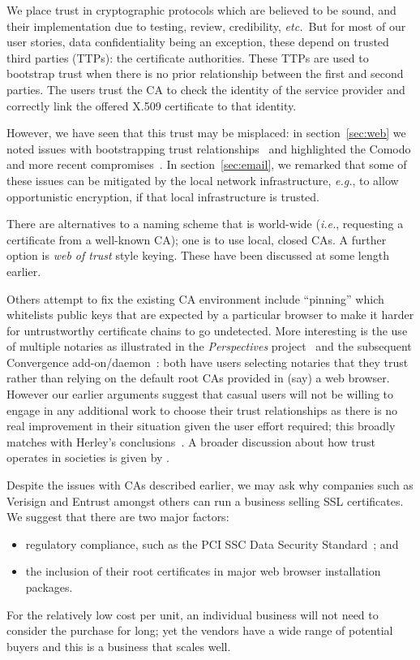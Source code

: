 \documentclass{article}
\def\citeN{\citet}
\def\cite{\citep}
\newcommand{\eg}{\textit{e.g.}}
\newcommand{\etc}{\textit{etc.}}
\newcommand{\ie}{\textit{i.e.}}
\begin{document}
We place trust in cryptographic protocols which are believed to be
sound, and their implementation due to testing, review, credibility,
\etc\  But for most of our user stories, data confidentiality being
an exception, these depend on trusted third parties (TTPs): the certificate authorities.  These
TTPs are used to bootstrap trust when there is no prior relationship
between the first and second parties.
The users trust the CA to check the identity of the service provider and correctly link the offered X.509 certificate to that identity.

However, we have seen that this trust may be misplaced: in
section~\ref{sec:web} we noted issues with bootstrapping trust
relationships~\cite{Perlman99} and highlighted the Comodo and more recent
compromises~\cite{mComodo1}.  In section~\ref{sec:email}, we remarked
that some of these issues can be mitigated by the local network
infrastructure, \eg, to allow opportunistic encryption, if that local infrastructure  is
trusted.

There are alternatives to a  naming scheme that is world-wide (\ie,
requesting a certificate from a well-known CA); one  is to
use local, closed CAs.  A further option is  \emph{web of trust}
style keying.  These have been discussed at some length earlier.  

Others attempt to fix the existing CA environment include “pinning” which
whitelists public keys that are expected by a particular browser to
make it harder for untrustworthy certificate chains to go undetected.
More interesting is the use of multiple notaries as illustrated in the \textit{Perspectives} project~\cite{Wendlandt+08} and the subsequent Convergence add-on/daemon~\cite{Marlinspike12}: both have users selecting notaries that they trust rather than relying on the default root CAs provided in (say) a web browser.  
However our earlier arguments suggest that casual users will not be willing to engage in any additional work to choose their trust relationships as there is no real improvement in their situation given the user effort required; this broadly matches with Herley's conclusions~\cite{Herley09}.  
A broader discussion about how trust operates in societies is given by \citeN{Schneier12}.

Despite the issues with CAs described earlier, we may ask why companies such as Verisign and Entrust amongst others can run a business selling SSL certificates. 
We suggest that there are two major factors:
\begin{itemize}
\item regulatory compliance, such as the PCI SSC Data Security Standard~\cite{PCIDSS}; and
\item the inclusion of their root certificates in major web browser installation packages.
\end{itemize}
For the relatively low cost per unit, an individual business will not need to consider the purchase for long; yet the vendors have a wide range of potential buyers and this is a business that scales well.
\end{document}
